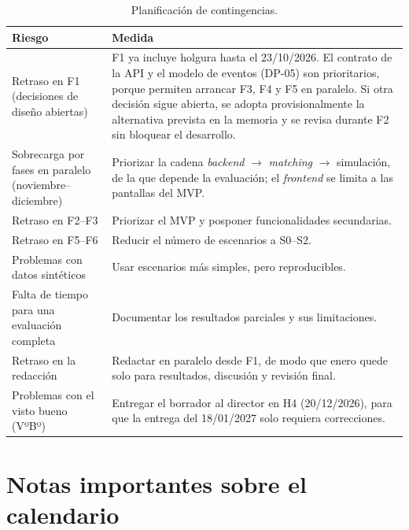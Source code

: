 \begin{table}[H]
  \centering
  \begin{tabularx}{\textwidth}{Y{0.8732} Y{1.1268}}
    \hline
    \textbf{Riesgo} & \textbf{Medida} \\
    \hline
    Retraso en F1 (decisiones de diseño abiertas) & F1 ya incluye holgura hasta el 23/10/2026. El contrato de la API y el modelo de eventos (DP-05) son prioritarios, porque permiten arrancar F3, F4 y F5 en paralelo. Si otra decisión sigue abierta, se adopta provisionalmente la alternativa prevista en la memoria y se revisa durante F2 sin bloquear el desarrollo. \\
    Sobrecarga por fases en paralelo (noviembre--diciembre) & Priorizar la cadena \textit{backend} $\rightarrow$ \textit{matching} $\rightarrow$ simulación, de la que depende la evaluación; el \textit{frontend} se limita a las pantallas del MVP. \\
    Retraso en F2--F3 & Priorizar el MVP y posponer funcionalidades secundarias. \\
    Retraso en F5--F6 & Reducir el número de escenarios a S0--S2. \\
    Problemas con datos sintéticos & Usar escenarios más simples, pero reproducibles. \\
    Falta de tiempo para una evaluación completa & Documentar los resultados parciales y sus limitaciones. \\
    Retraso en la redacción & Redactar en paralelo desde F1, de modo que enero quede solo para resultados, discusión y revisión final. \\
    Problemas con el visto bueno (VºBº) & Entregar el borrador al director en H4 (20/12/2026), para que la entrega del 18/01/2027 solo requiera correcciones. \\
    \hline
  \end{tabularx}
  \caption{Planificación de contingencias.}
  \label{tab:contingencias-calendario}
\end{table}

\section{Notas importantes sobre el calendario}

